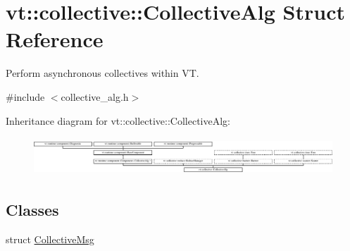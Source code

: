 \hypertarget{structvt_1_1collective_1_1_collective_alg}{}\section{vt\+:\+:collective\+:\+:Collective\+Alg Struct Reference}
\label{structvt_1_1collective_1_1_collective_alg}


Perform asynchronous collectives within VT.  




{\ttfamily \#include $<$collective\+\_\+alg.\+h$>$}

Inheritance diagram for vt\+:\+:collective\+:\+:Collective\+Alg\+:\begin{figure}[H]
\begin{center}
\leavevmode
\includegraphics[height=1.435897cm]{structvt_1_1collective_1_1_collective_alg}
\end{center}
\end{figure}
\subsection*{Classes}
\begin{DoxyCompactItemize}
\item 
struct \hyperlink{structvt_1_1collective_1_1_collective_alg_1_1_collective_msg}{Collective\+Msg}
\end{DoxyCompactItemize}
